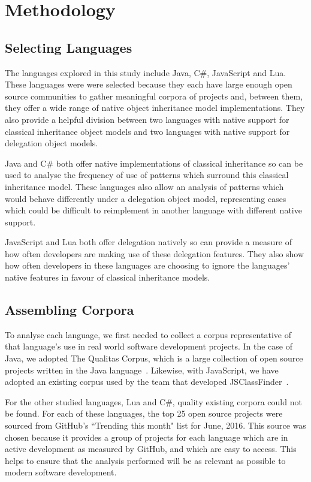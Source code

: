 \chapter{Methodology}\label{C:method} 

\section{Selecting Languages}
The languages explored in this study include Java, C\#, JavaScript and Lua. These languages were were selected because they each have large enough open source communities to gather meaningful corpora of projects and, between them, they offer a wide range of native object inheritance model implementations. They also provide a helpful division between two languages with native support for classical inheritance object models and two languages with native support for delegation object models.
\newline

Java and C\# both offer native implementations of classical inheritance so can be used to analyse the frequency of use of patterns which surround this classical inheritance model. These languages also allow an analysis of patterns which would behave differently under a delegation object model, representing cases which could be difficult to reimplement in another language with different native support.
\newline

JavaScript and Lua both offer delegation natively so can provide a measure of how often developers are making use of these delegation features. They also show how often developers in these languages are choosing to ignore the languages' native features in favour of classical inheritance models.

\section{Assembling Corpora}
To analyse each language, we first needed to collect a corpus representative of that language's use in real world software development projects. In the case of Java, we adopted The Qualitas Corpus, which is a large collection of open source projects written in the Java language~\cite{QualitasCorpus}. Likewise, with JavaScript, we have adopted an existing corpus used by the team that developed JSClassFinder~\cite{JSClassFinder}.
\newline

For the other studied languages, Lua and C\#, quality existing corpora could not be found. For each of these languages, the top 25 open source projects were sourced from GitHub's ``Trending this month" list for June, 2016. This source was chosen because it provides a group of projects for each language which are in active development as measured by GitHub, and which are easy to access. This helps to ensure that the analysis performed will be as relevant as possible to modern software development.

